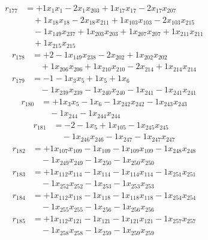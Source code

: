 \[\begin{aligned}
r_{177} &= + 1 x_{1} x_{1} - 2 x_{1} x_{203} + 1 x_{17} x_{17} - 2 x_{17} x_{207} \\
 &\quad + 1 x_{18} x_{18} - 2 x_{18} x_{211} + 1 x_{103} x_{103} - 2 x_{103} x_{215} \\
 &\quad - 1 x_{149} x_{237} + 1 x_{203} x_{203} + 1 x_{207} x_{207} + 1 x_{211} x_{211} \\
 &\quad + 1 x_{215} x_{215}
\end{aligned}\]
\[\begin{aligned}
r_{178} &= + 2 - 1 x_{149} x_{238} - 2 x_{202} + 1 x_{202} x_{202} \\
 &\quad + 1 x_{206} x_{206} + 1 x_{210} x_{210} - 2 x_{214} + 1 x_{214} x_{214}
\end{aligned}\]
\[\begin{aligned}
r_{179} &= - 1 - 1 x_{3} x_{5} + 1 x_{5} + 1 x_{6} \\
 &\quad - 1 x_{239} x_{239} - 1 x_{240} x_{240} - 1 x_{241} - 1 x_{241} x_{241}
\end{aligned}\]
\[\begin{aligned}
r_{180} &= + 1 x_{3} x_{5} - 1 x_{6} - 1 x_{242} x_{242} - 1 x_{243} x_{243} \\
 &\quad - 1 x_{244} - 1 x_{244} x_{244}
\end{aligned}\]
\[\begin{aligned}
r_{181} &= - 2 - 1 x_{5} + 1 x_{105} - 1 x_{245} x_{245} \\
 &\quad - 1 x_{246} x_{246} - 1 x_{247} - 1 x_{247} x_{247}
\end{aligned}\]
\[\begin{aligned}
r_{182} &= + 1 x_{107} x_{109} - 1 x_{109} - 1 x_{109} x_{109} - 1 x_{248} x_{248} \\
 &\quad - 1 x_{249} x_{249} - 1 x_{250} - 1 x_{250} x_{250}
\end{aligned}\]
\[\begin{aligned}
r_{183} &= + 1 x_{112} x_{114} - 1 x_{114} - 1 x_{114} x_{114} - 1 x_{251} x_{251} \\
 &\quad - 1 x_{252} x_{252} - 1 x_{253} - 1 x_{253} x_{253}
\end{aligned}\]
\[\begin{aligned}
r_{184} &= + 1 x_{112} x_{118} - 1 x_{118} - 1 x_{118} x_{118} - 1 x_{254} x_{254} \\
 &\quad - 1 x_{255} x_{255} - 1 x_{256} - 1 x_{256} x_{256}
\end{aligned}\]
\[\begin{aligned}
r_{185} &= + 1 x_{112} x_{121} - 1 x_{121} - 1 x_{121} x_{121} - 1 x_{257} x_{257} \\
 &\quad - 1 x_{258} x_{258} - 1 x_{259} - 1 x_{259} x_{259}
\end{aligned}\]
